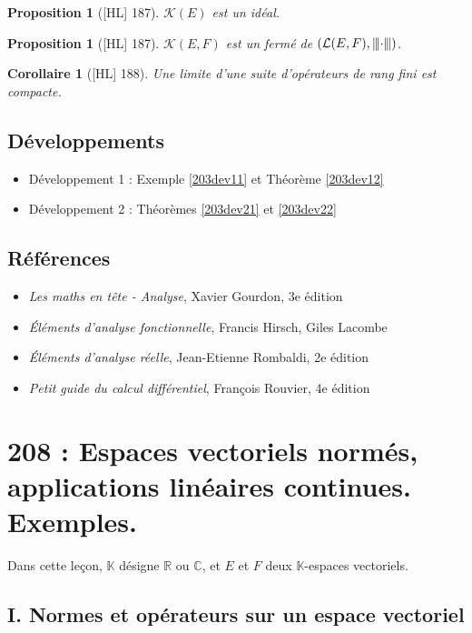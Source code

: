\documentclass[10pt, a4paper, parskip=full, twoside, twocolumn]{report}
\newtheorem{proposition}[definition]{Proposition}
\newtheorem{corollary}[definition]{Corollaire}
\newcommand{\IK}{\mathbb{K}}
\newcommand{\IC}{\mathbb{C}}
\newcommand{\IR}{\mathbb{R}}
\newcommand{\vertiii}[1]{{\left\vert\kern-0.25ex\left\vert\kern-0.25ex\left\vert #1 
    \right\vert\kern-0.25ex\right\vert\kern-0.25ex\right\vert}}
\begin{document}
\begin{proposition}[\textnormal{[HL] 187}]
	$\mathcal{K}(E)$ est un idéal.
\end{proposition}

\begin{proposition}[\textnormal{[HL] 187}]
	$\mathcal{K}(E,F)$ est un fermé de $(\mathcal{L}(E,F), \vertiii \cdot)$.
\end{proposition}

\begin{corollary}[\textnormal{[HL] 188}]
	Une limite d'une suite d'opérateurs de rang fini est compacte.
\end{corollary}

\section*{Développements}
\begin{itemize}
	\item Développement 1 : Exemple \ref{203dev11} et Théorème \ref{203dev12}
	\item Développement 2 : Théorèmes \ref{203dev21} et \ref{203dev22}
\end{itemize}

\section*{Références}
\begin{itemize}
	\item[G] \emph{Les maths en tête - Analyse}, Xavier Gourdon, 3e édition 
	\item[HL] \emph{Éléments d'analyse fonctionnelle}, Francis Hirsch, Giles Lacombe
	\item[R] \emph{Éléments d'analyse réelle}, Jean-Etienne Rombaldi, 2e édition
	\item[Rv] \emph{Petit guide du calcul différentiel}, François Rouvier, 4e édition
\end{itemize}


\chapter*{208 : Espaces vectoriels normés, applications linéaires continues. Exemples.}
\setcounter{definition}{0}

\textcolor{paragraphtext}{Dans cette leçon, $\IK$ désigne $\IR$ ou $\IC$, et $E$ et $F$ deux $\IK$-espaces vectoriels.}
\section*{I. Normes et opérateurs sur un espace vectoriel}
\end{document}
